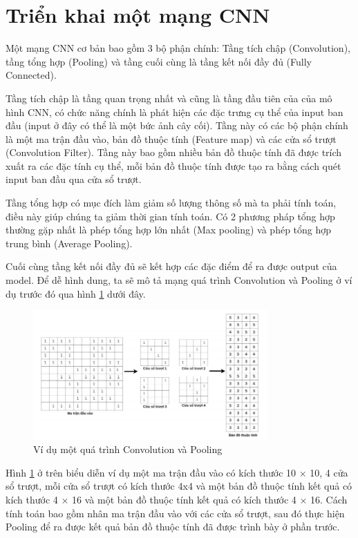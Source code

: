 \documentclass[a4paper]{article}
\begin{document}
\section{Triển khai một mạng CNN}
Một mạng CNN cơ bản bao gồm 3 bộ phận chính: Tầng tích chập (Convolution), tầng tổng hợp (Pooling) và tầng cuối cùng là tầng kết nối đầy đủ (Fully Connected).

Tầng tích chập là tầng quan trọng nhất và cũng là tầng đầu tiên của của mô hình CNN, có chức năng chính là phát hiện các đặc trưng cụ thể của input ban đầu (input ở đây có thể là một bức ảnh cây cối). Tầng này có các bộ phận chính là một ma trận đầu vào, bản đồ thuộc tính (Feature map) và các cửa sổ trượt (Convolution Filter). Tầng này bao gồm nhiều bản đồ thuộc tính đã được trích xuất ra các đặc tính cụ thể, mỗi bản đồ thuộc tính được tạo ra bằng cách quét input ban đầu qua cửa sổ trượt.

Tầng tổng hợp có mục đích làm giảm số lượng thông số mà ta phải tính toán, điều này giúp chúng ta giảm thời gian tính toán. Có 2 phương pháp tổng hợp thường gặp nhất là phép tổng hợp lớn nhất (Max pooling) và phép tổng hợp trung bình
(Average Pooling).

Cuối cùng tầng kết nối đầy đủ sẽ kết hợp các đặc điểm để ra được output của model.
Để dễ hình dung, ta sẽ mô tả mạng quá trình Convolution và Pooling ở ví dụ trước
đó qua hình \ref{fig:convolutionAndPooling} dưới đây.


\begin{figure}
    \centering
    \includegraphics[width=0.8\textwidth]{image/convolutionAndPooling.png}
    \caption{Ví dụ một quá trình Convolution và Pooling}
    \label{fig:convolutionAndPooling}
\end{figure}

Hình \ref{fig:convolutionAndPooling} ở trên biểu diễn ví dụ một ma trận đầu vào có kích thước 10 × 10, 4 cửa sổ trượt, mỗi cửa sổ trượt có kích thước 4x4 và một bản đồ thuộc tính kết quả có kích thước 4 × 16 và một bản đồ thuộc tính kết quả có kích thước 4 × 16. Cách tính toán bao gồm nhân ma trận đầu vào với các cửa sổ trượt, sau đó thực hiện Pooling
để ra được kết quả bản đồ thuộc tính đã được trình bày ở phần trước.
\end{document}
